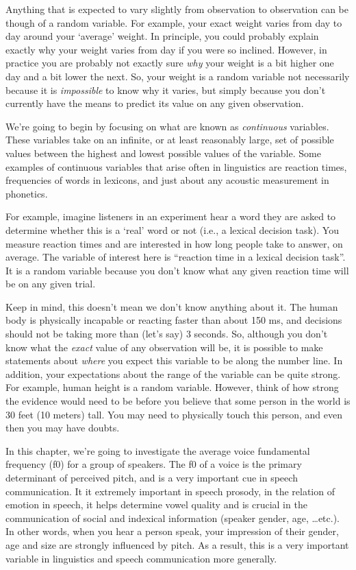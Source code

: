 \documentclass[
]{book}
\begin{document}
Anything that is expected to vary slightly from observation to observation can be though of a random variable. For example, your exact weight varies from day to day around your `average' weight. In principle, you could probably explain exactly why your weight varies from day if you were so inclined. However, in practice you are probably not exactly sure \emph{why} your weight is a bit higher one day and a bit lower the next. So, your weight is a random variable not necessarily because it is \emph{impossible} to know why it varies, but simply because you don't currently have the means to predict its value on any given observation.

We're going to begin by focusing on what are known as \emph{continuous} variables. These variables take on an infinite, or at least reasonably large, set of possible values between the highest and lowest possible values of the variable. Some examples of continuous variables that arise often in linguistics are reaction times, frequencies of words in lexicons, and just about any acoustic measurement in phonetics.

For example, imagine listeners in an experiment hear a word they are asked to determine whether this is a `real' word or not (i.e., a lexical decision task). You measure reaction times and are interested in how long people take to answer, on average. The variable of interest here is ``reaction time in a lexical decision task''. It is a random variable because you don't know what any given reaction time will be on any given trial.

Keep in mind, this doesn't mean we don't know anything about it. The human body is physically incapable or reacting faster than about 150 ms, and decisions should not be taking more than (let's say) 3 seconds. So, although you don't know what the \emph{exact} value of any observation will be, it is possible to make statements about \emph{where} you expect this variable to be along the number line. In addition, your expectations about the range of the variable can be quite strong. For example, human height is a random variable. However, think of how strong the evidence would need to be before you believe that some person in the world is 30 feet (10 meters) tall. You may need to physically touch this person, and even then you may have doubts.

In this chapter, we're going to investigate the average voice fundamental frequency (f0) for a group of speakers. The f0 of a voice is the primary determinant of perceived pitch, and is a very important cue in speech communication. It it extremely important in speech prosody, in the relation of emotion in speech, it helps determine vowel quality and is crucial in the communication of social and indexical information (speaker gender, age, \ldots etc.). In other words, when you hear a person speak, your impression of their gender, age and size are strongly influenced by pitch. As a result, this is a very important variable in linguistics and speech communication more generally.
\end{document}
